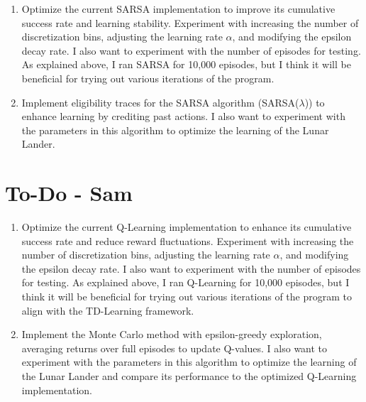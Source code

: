 \documentclass[journal]{IEEEtran}
\begin{document}
\begin{enumerate}[label=\arabic*.]
    \item Optimize the current SARSA implementation to improve its cumulative success rate and learning stability. Experiment with increasing the number of discretization bins, adjusting the learning rate $\alpha$, and modifying the epsilon decay rate. I also want to experiment with the number of episodes for testing. As explained above, I ran SARSA for 10,000 episodes, but I think it will be beneficial for trying out various iterations of the program.
    \item Implement eligibility traces for the SARSA algorithm (SARSA($\lambda$)) to enhance learning by crediting past actions. I also want to experiment with the parameters in this algorithm to optimize the learning of the Lunar Lander.
\end{enumerate}

\section{To-Do - Sam}
\begin{enumerate}[label=\arabic*.]
    \item Optimize the current Q-Learning implementation to enhance its cumulative success rate and reduce reward fluctuations. Experiment with increasing the number of discretization bins, adjusting the learning rate $\alpha$, and modifying the epsilon decay rate. I also want to experiment with the number of episodes for testing. As explained above, I ran Q-Learning for 10,000 episodes, but I think it will be beneficial for trying out various iterations of the program to align with the TD-Learning framework.
    \item Implement the Monte Carlo method with epsilon-greedy exploration, averaging returns over full episodes to update Q-values. I also want to experiment with the parameters in this algorithm to optimize the learning of the Lunar Lander and compare its performance to the optimized Q-Learning implementation.
\end{enumerate}
\end{document}
